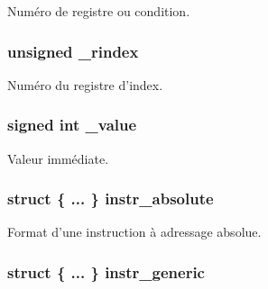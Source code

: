 \-Numéro de registre ou condition. 

\hypertarget{union_instruction_a5b83cbbfd9b2a340e978069a3607a680}{
\subsubsection[{\-\_\-rindex}]{\setlength{\rightskip}{0pt plus 5cm}unsigned {\bf \-\_\-rindex}}}\label{union_instruction_a5b83cbbfd9b2a340e978069a3607a680}


\-Numéro du registre d'index. 

\hypertarget{union_instruction_ab38556b2069bd4af524024e6045fc711}{
\subsubsection[{\-\_\-value}]{\setlength{\rightskip}{0pt plus 5cm}signed int {\bf \-\_\-value}}}\label{union_instruction_ab38556b2069bd4af524024e6045fc711}


\-Valeur immédiate. 

\hypertarget{union_instruction_aad60aa5074ecb500e3a90bae25b7e27a}{
\subsubsection[{instr\-\_\-absolute}]{\setlength{\rightskip}{0pt plus 5cm}struct \{ ... \}   {\bf instr\-\_\-absolute}}}\label{union_instruction_aad60aa5074ecb500e3a90bae25b7e27a}


\-Format d'une instruction à adressage absolue. 

\hypertarget{union_instruction_a655fbddb807dcc35363d6149dbb26237}{
\subsubsection[{instr\-\_\-generic}]{\setlength{\rightskip}{0pt plus 5cm}struct \{ ... \}   {\bf instr\-\_\-generic}}}\label{union_instruction_a655fbddb807dcc35363d6149dbb26237}


